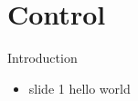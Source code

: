 

\section{Control}




\begin{frame}{Introduction}{}

\begin{itemize}
	\item slide 1 hello world
\end{itemize}

\end{frame}
